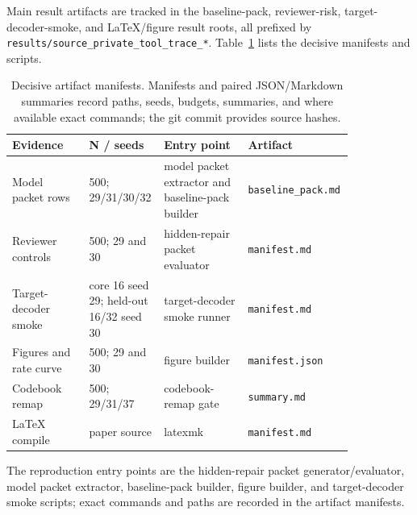 \documentclass{article}
\begin{document}
Main result artifacts are tracked in the baseline-pack, reviewer-risk,
target-decoder-smoke, and LaTeX/figure result roots, all prefixed by
\texttt{results/source\_private\_tool\_trace\_*}. Table~\ref{tab:artifacts}
lists the decisive manifests and scripts.

\begin{table}[t]
\centering
\scriptsize
\setlength{\tabcolsep}{2pt}
\begin{tabular}{p{0.22\linewidth}p{0.16\linewidth}p{0.24\linewidth}p{0.22\linewidth}}
\toprule
Evidence & N / seeds & Entry point & Artifact \\
\midrule
Model packet rows & 500; 29/31/30/32 & model packet extractor and baseline-pack builder & \texttt{baseline\_pack.md} \\
Reviewer controls & 500; 29 and 30 & hidden-repair packet evaluator & \texttt{manifest.md} \\
Target-decoder smoke & core 16 seed 29; held-out 16/32 seed 30 & target-decoder smoke runner & \texttt{manifest.md} \\
Figures and rate curve & 500; 29 and 30 & figure builder & \texttt{manifest.json} \\
Codebook remap & 500; 29/31/37 & codebook-remap gate & \texttt{summary.md} \\
LaTeX compile & paper source & latexmk & \texttt{manifest.md} \\
\bottomrule
\end{tabular}
\caption{Decisive artifact manifests. Manifests and paired JSON/Markdown
summaries record paths, seeds, budgets, summaries, and where available exact
commands; the git commit provides source hashes.}
\label{tab:artifacts}
\end{table}

The reproduction entry points are the hidden-repair packet generator/evaluator,
model packet extractor, baseline-pack builder, figure builder, and
target-decoder smoke scripts; exact commands and paths are recorded in the
artifact manifests.
\end{document}
